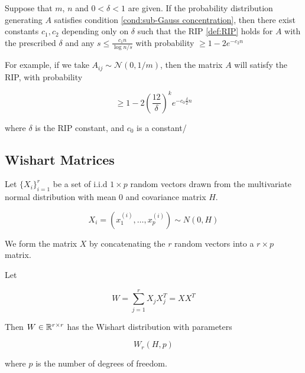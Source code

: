 \begin{theorem}
Suppose that \(m\), \(n\) and \(0 < \delta < 1\) are given. If the probability distribution generating \(A\) satisfies condition \eqref{cond:sub-Gauss concentration}, then there exist constants \(c_1, c_2\) depending only on \(\delta\) such that the RIP \eqref{def:RIP} holds for \(A\) with the prescribed \(\delta\) and any  \(s \leq \frac{c_1 n}{\log{n/s}}\) with probability \(\geq 1-2e^{-c_2n}\) 
\end{theorem}

For example, if we take \(A_{ij} \sim \mathcal{N}\left(0, 1/m\right)\), then the matrix \(A\) will satisfy the RIP, with probability \cite{baraniuk2008simple}

\begin{equation}
\geq 1-2\left(\frac{12}{\delta}\right)^k e^{-c_0\frac{\delta}{2}n}
\end{equation}

where \(\delta\) is the RIP constant, and \(c_0\) is a constant/

\subsection{Wishart Matrices}

Let \(\{X_i\}_{i=1}^r\) be a set of i.i.d \(1 \times p\) random vectors drawn from the multivariate normal distribution with mean 0 and covariance matrix \(H\).

\begin{equation}
X_i = \left(x_1^{(i)}, \ldots , x_p^{(i)}\right) \sim N\left(0, H\right)
\end{equation}

We form the matrix \(X\) by concatenating the \(r\) random vectors into a \(r \times p\) matrix.

\begin{definition}
Let 

\begin{equation}
W = \sum_{j=1}^r X_j X_j^T =  X X^T
\end{equation}

Then \(W \in {\mathbb{R}}^{r \times r}\) has the Wishart distribution with parameters 

\begin{equation}
W_r\left(H, p\right)
\end{equation}

where \(p\) is the number of degrees of freedom.
\end{definition}

